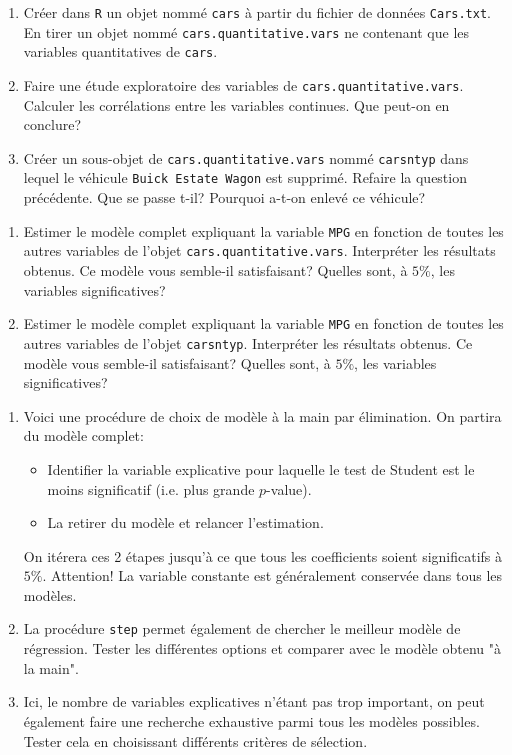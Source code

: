 \documentclass{td_um}
\providecommand{\1}{\mathds{1}}
\begin{document}
        \begin{enumerate}
            \item  Créer dans \texttt{R} un objet nommé \texttt{cars} à partir du fichier de données \texttt{Cars.txt}. En tirer un objet nommé \texttt{cars.quantitative.vars} ne contenant que les variables quantitatives de \texttt{cars}.
        \item  Faire une étude exploratoire des variables de \texttt{cars.quantitative.vars}. Calculer les corrélations entre les variables continues. Que peut-on en conclure?
        \item  Créer un sous-objet de \texttt{cars.quantitative.vars} nommé \texttt{carsntyp} dans lequel le véhicule \texttt{Buick Estate Wagon} est supprimé. Refaire la question précédente. Que se passe t-il? Pourquoi a-t-on enlevé ce véhicule?
\end{enumerate}
    \begin{enumerate}
        \item  Estimer le modèle complet expliquant la variable \texttt{MPG} en fonction de toutes les autres variables de l'objet \texttt{cars.quantitative.vars}. Interpréter les résultats obtenus. Ce modèle vous semble-il satisfaisant? Quelles sont, à $5 \%$, les variables significatives?
        \item  Estimer le modèle complet expliquant la variable \texttt{MPG} en fonction de toutes les autres variables de l'objet \texttt{carsntyp}. Interpréter les résultats obtenus. Ce modèle vous semble-il satisfaisant? Quelles sont, à $5 \%$, les variables significatives?
\end{enumerate}
    \begin{enumerate}
        \item  Voici une procédure de choix de modèle à la main par élimination. On partira du modèle complet:
        \begin{itemize}
             \item Identifier la variable explicative pour laquelle le test de Student est le moins significatif (i.e. plus grande $p$-value).
            \item  La retirer du modèle et relancer l'estimation.
        \end{itemize}
On itérera ces 2 étapes jusqu'à ce que tous les coefficients soient significatifs à $5 \% .$ Attention! La variable constante est généralement conservée dans tous les modèles.
\item La procédure \texttt{step} permet également de chercher le meilleur modèle de régression. Tester les différentes options et comparer avec le modèle obtenu "à la main".
\item Ici, le nombre de variables explicatives n'étant pas trop important, on peut également faire une recherche exhaustive parmi tous les modèles possibles. Tester cela en choisissant différents critères de sélection.
\end{enumerate}
\end{document}
